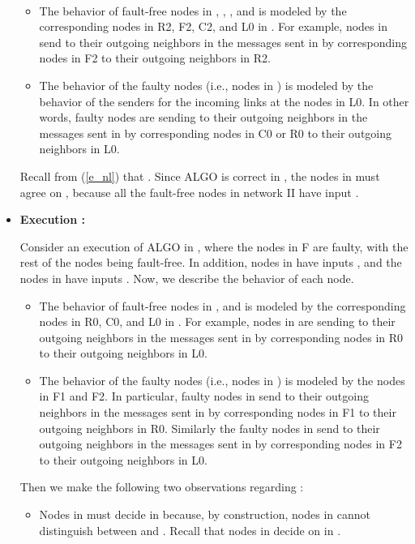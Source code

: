 \documentclass[letterpaper, 11pt]{article}
\newenvironment{proof}{\noindent {\bf Proof:}~}{\hspace*{\fill}}
\begin{document}
\begin{proof}
\begin{itemize}
\begin{itemize}
\item The behavior of fault-free nodes in , , , and  is modeled by the corresponding nodes in R2, F2, C2, and L0 in . For example, nodes in  send to their outgoing neighbors in  the messages sent in  by corresponding nodes in F2 to their outgoing neighbors in R2.

\item The behavior of the faulty nodes (i.e., nodes in ) is modeled by the behavior of the senders for the incoming links at the nodes in L0. In other words, faulty nodes are sending to their outgoing neighbors in  the messages sent in  by corresponding nodes in C0 or R0 to their outgoing neighbors in L0.
\end{itemize}
Recall from (\ref{e_nl}) that . Since ALGO is correct in , the nodes in  must agree on , because all the fault-free nodes in network II have input .

\item {\bf Execution :}

Consider an execution  of ALGO in , where the nodes in F are faulty, with the rest of the nodes being fault-free. In addition, nodes in  have inputs , and the nodes in  have inputs . Now, we describe the behavior of each node.


\begin{itemize}
\item The behavior of fault-free nodes in ,  and  is modeled by the corresponding nodes in R0, C0, and L0 in . For example, nodes in  are sending to their outgoing neighbors in  the messages sent in  by corresponding nodes in R0 to their outgoing neighbors in L0.

\item The behavior of the faulty nodes (i.e., nodes in ) is modeled by the nodes in F1 and F2. In particular, faulty nodes in  send to their outgoing neighbors in  the messages sent in  by corresponding nodes in F1 to their outgoing neighbors in R0. Similarly the faulty nodes in  send to their outgoing neighbors in  the messages sent in  by corresponding nodes in F2 to their outgoing neighbors in L0.  
\end{itemize}

Then we make the following two observations regarding :

\begin{itemize}
\item Nodes in  must decide  in 
because, by construction, nodes in  cannot distinguish between  and . 
Recall that nodes in  decide on  in .




\end{itemize}
\end{itemize}
\end{proof}
\end{document}
